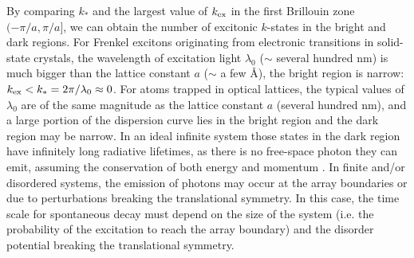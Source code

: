 By comparing $k_*$ and the largest value of $k_{\rm ex}$ in the first Brillouin zone $(-\pi/a, \pi/a]$, we can obtain
the number of excitonic $k$-states in the bright and dark regions. 
For Frenkel excitons originating from electronic transitions in solid-state crystals, the wavelength of excitation light
 $\lambda_0$ ($\sim$ several hundred nm) is much bigger than the lattice constant $a$ ($\sim$ a few {\AA}), the bright region is 
narrow: $ k_{\rm ex} < k_* = 2\pi/\lambda_0\approx 0$. For atoms trapped in optical lattices, the typical values of $\lambda_0$ are of the same magnitude as the lattice constant $a$ (several hundred nm), and a large portion of the
 dispersion curve lies in the bright region and the dark region may be narrow. 
 In an ideal infinite system those states in the dark region have infinitely long radiative lifetimes, as there is no free-space 
photon they can emit, assuming the conservation of both energy and momentum \cite{electronic-exciton1, 
electronic-exciton2, agranovich1966, agranovich}.
In finite and/or disordered systems, the emission of photons may occur at the array boundaries or due to perturbations 
breaking the translational symmetry. In this case, the time scale for spontaneous decay must depend on 
the size of the system (i.e. the probability of the excitation to reach the array boundary) and the disorder potential 
breaking the translational symmetry.  

